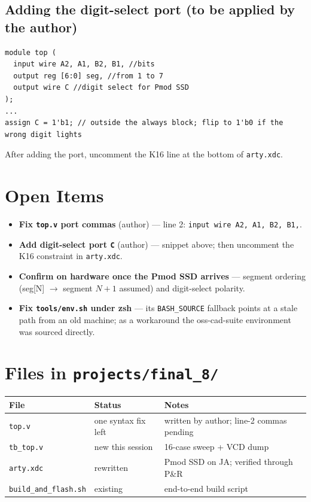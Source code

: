 \documentclass[11pt]{article}
\begin{document}
\subsection*{Adding the digit-select port (to be applied by the author)}
\begin{lstlisting}
module top (
  input wire A2, A1, B2, B1, //bits
  output reg [6:0] seg, //from 1 to 7
  output wire C //digit select for Pmod SSD
);
...
assign C = 1'b1; // outside the always block; flip to 1'b0 if the wrong digit lights
\end{lstlisting}
After adding the port, uncomment the K16 line at the bottom of
\texttt{arty.xdc}.

\section{Open Items}
\begin{itemize}
  \item \textbf{Fix \texttt{top.v} port commas} (author) --- line 2:
        \texttt{input wire A2, A1, B2, B1,}.
  \item \textbf{Add digit-select port \texttt{C}} (author) --- snippet
        above; then uncomment the K16 constraint in \texttt{arty.xdc}.
  \item \textbf{Confirm on hardware once the Pmod SSD arrives} ---
        segment ordering (seg[N] $\to$ segment $N{+}1$ assumed) and
        digit-select polarity.
  \item \textbf{Fix \texttt{tools/env.sh} under zsh} --- its
        \texttt{BASH\_SOURCE} fallback points at a stale path from an
        old machine; as a workaround the oss-cad-suite environment was
        sourced directly.
\end{itemize}

\section{Files in \texttt{projects/final\_8/}}
\begin{tabular}{@{}lll@{}}
\toprule
File & Status & Notes \\
\midrule
\texttt{top.v} & one syntax fix left & written by author; line-2 commas pending \\
\texttt{tb\_top.v} & new this session & 16-case sweep + VCD dump \\
\texttt{arty.xdc} & rewritten & Pmod SSD on JA; verified through P\&R \\
\texttt{build\_and\_flash.sh} & existing & end-to-end build script \\
\bottomrule
\end{tabular}
\end{document}
